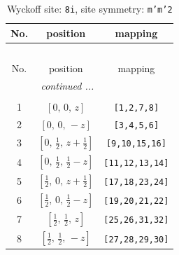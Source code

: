 \documentclass[fleqn,8pt]{jsarticle}
\begin{document}
\begin{longtable}{ccc}
\caption{Wyckoff site: {\tt 8i}, site symmetry: {\tt m'm'2}}
 \\
 \hline \hline
No. & position & mapping \\ \hline \endfirsthead

\multicolumn{2}{l}{\tablename\ \thetable{}} \\
 \hline \hline
No. & position & mapping \\ \hline \endhead

 \hline \hline
\multicolumn{2}{r}{\footnotesize\it continued ...} \\ \endfoot

 \hline \hline
\multicolumn{2}{r}{} \\ \endlastfoot

1 & $\left[ 0,\, 0,\, z \right]$ & {\tt [1,2,7,8]} \\ \hline
2 & $\left[ 0,\, 0,\, - z \right]$ & {\tt [3,4,5,6]} \\ \hline
3 & $\left[ 0,\, \frac{1}{2},\, z + \frac{1}{2} \right]$ & {\tt [9,10,15,16]} \\ \hline
4 & $\left[ 0,\, \frac{1}{2},\, \frac{1}{2} - z \right]$ & {\tt [11,12,13,14]} \\ \hline
5 & $\left[ \frac{1}{2},\, 0,\, z + \frac{1}{2} \right]$ & {\tt [17,18,23,24]} \\ \hline
6 & $\left[ \frac{1}{2},\, 0,\, \frac{1}{2} - z \right]$ & {\tt [19,20,21,22]} \\ \hline
7 & $\left[ \frac{1}{2},\, \frac{1}{2},\, z \right]$ & {\tt [25,26,31,32]} \\ \hline
8 & $\left[ \frac{1}{2},\, \frac{1}{2},\, - z \right]$ & {\tt [27,28,29,30]} \\
\end{longtable}
\renewcommand{\arraystretch}{1.2}
\end{document}
